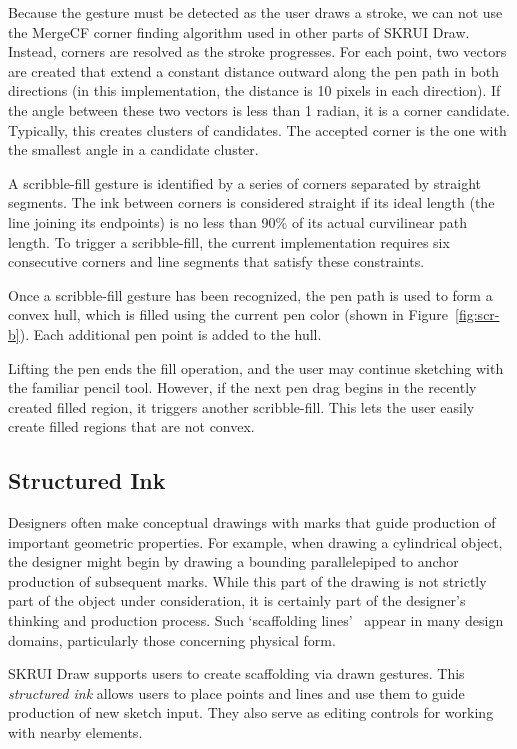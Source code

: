 \documentclass{egpubl}
\begin{document}
Because the gesture must be detected as the user draws a stroke, we
can not use the MergeCF corner finding algorithm used in other parts
of SKRUI Draw. Instead, corners are resolved as the stroke
progresses. For each point, two vectors are created that extend a
constant distance outward along the pen path in both directions (in
this implementation, the distance is 10 pixels in each direction). If
the angle between these two vectors is less than 1 radian, it is a
corner candidate. Typically, this creates clusters of candidates. The
accepted corner is the one with the smallest angle in a candidate cluster.

A scribble-fill gesture is identified by a series of corners separated
by straight segments. The ink between corners is considered straight
if its ideal length (the line joining its endpoints) is no less than
90\% of its actual curvilinear path length. To trigger a
scribble-fill, the current implementation requires six consecutive
corners and line segments that satisfy these constraints. 

Once a scribble-fill gesture has been recognized, the pen path is used
to form a convex hull, which is filled using the current pen color
(shown in Figure~\ref{fig:scr-b}). Each additional pen point is added
to the hull.

Lifting the pen ends the fill operation, and the user may continue
sketching with the familiar pencil tool. However, if the next pen drag
begins in the recently created filled region, it triggers another
scribble-fill. This lets the user easily create filled regions that
are not convex.

\subsection{Structured Ink}

Designers often make conceptual drawings with marks that guide
production of important geometric properties. For example, when
drawing a cylindrical object, the designer might begin by drawing a
bounding parallelepiped to anchor production of subsequent marks. While
this part of the drawing is not strictly part of the object under
consideration, it is certainly part of the designer's thinking and
production process. Such `scaffolding lines'~\cite{company-modes}
appear in many design domains, particularly those concerning physical
form.

SKRUI Draw supports users to create scaffolding via drawn
gestures. This \emph{structured ink} allows users to place points and
lines and use them to guide production of new sketch input. They also
serve as editing controls for working with nearby elements.
\end{document}
